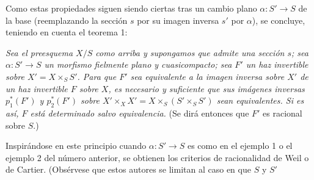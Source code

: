 Como estas propiedades siguen siendo ciertas tras un cambio plano
$\alpha:S'\longrightarrow S$ de la base (reemplazando la sección $s$ por su
imagen inversa $s'$ por $\alpha$), se concluye, teniendo en cuenta el teorema 1:

\emph{Sea el preesquema $X/S$ como arriba y supongamos que admite una sección
$s$; sea $\alpha:S'\longrightarrow S$ un morfismo fielmente plano y
cuasicompacto; sea $F'$ un haz invertible sobre $X'=X\times_SS'$. Para que $F'$
sea equivalente a la imagen inversa sobre $X'$ de un haz invertible $F$ sobre
$X$, es necesario y suficiente que sus imágenes inversas $p_1^*(F')$ y
$p_2^*(F')$ sobre $X'\times_XX'=X\times_S(S'\times_SS')$ sean equivalentes. Si
es así, $F$ está determinado salvo equivalencia.} (Se dirá entonces que $F'$
es racional sobre $S$.)

Inspirándose en este principio cuando $\alpha:S'\longrightarrow S$ es como en
el ejemplo 1 o el ejemplo 2 del número anterior, se obtienen los criterios de
racionalidad de Weil o de Cartier. (Obsérvese que estos autores se limitan al
caso en que $S$ y $S'$

